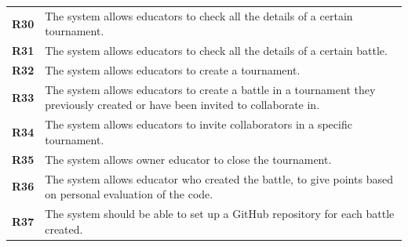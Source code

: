 \documentclass[12pt, a4paper]{report}
\begin{document}
    \begin{table}[H]
        \begin{tabularx}{\textwidth}{cX}
        \textbf{R30}  & The system allows educators to check all the details of a certain tournament.                                                   \\
        \textbf{R31}  & The system allows educators to check all the details of a certain battle.                                                       \\
        \textbf{R32}  & The system allows educators to create a tournament.                                                                             \\
        \textbf{R33}  & The system allows educators to create a battle in a tournament they previously created or have been invited to collaborate in.  \\
        \textbf{R34}  & The system allows educators to invite collaborators in a specific tournament.                                                   \\
        \textbf{R35}  & The system allows owner educator to close the tournament.                                                                       \\
        \textbf{R36}  & The system allows educator who created the battle, to give points based on personal evaluation of the code.                     \\
        \textbf{R37}  & The system should be able to set up a GitHub repository for each battle created.                                                \\                                              
        \end{tabularx}
    \end{table}
\end{document}
